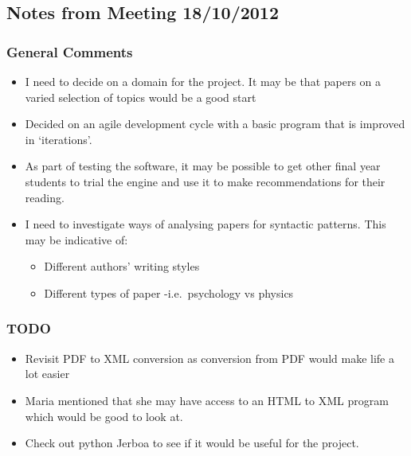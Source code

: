 \subsection{Notes from Meeting 18/10/2012}

\subsubsection{General Comments}

\begin{itemize}
\item
  I need to decide on a domain for the project. It may be that papers on
  a varied selection of topics would be a good start
\item
  Decided on an agile development cycle with a basic program that is
  improved in `iterations'.
\item
  As part of testing the software, it may be possible to get other final
  year students to trial the engine and use it to make recommendations
  for their reading.
\item
  I need to investigate ways of analysing papers for syntactic patterns.
  This may be indicative of:

  \begin{itemize}
  \item
    Different authors' writing styles
  \item
    Different types of paper -i.e.~psychology vs physics
  \end{itemize}
\end{itemize}

\subsubsection{TODO}

\begin{itemize}
\item
  Revisit PDF to XML conversion as conversion from PDF would make life a
  lot easier
\item
  Maria mentioned that she may have access to an HTML to XML program
  which would be good to look at.
\item
  Check out python Jerboa to see if it would be useful for the project.
\end{itemize}
